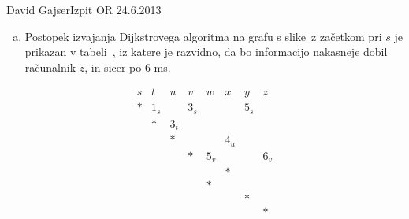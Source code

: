 \begin{naloga}{David Gajser}{Izpit OR 24.6.2013}
\begin{odgovor}
\begin{enumerate}[(a)]
\item Postopek izvajanja Dijkstrovega algoritma
na grafu s slike~ z začetkom pri $s$
je prikazan v tabeli~\tab,
iz katere je razvidno, da bo informacijo nakasneje dobil računalnik $z$,
in sicer po $6$ ms.
\end{enumerate}
%
\begin{slika}
\end{slika}
%
\begin{tabela}[h]
$$
\begin{array}{cccccccc}
s & t & u & v & w & x & y & z \\ \hline
* & 1_s && 3_s &&& 5_s & \\
& * & 3_t &&&&& \\
&& * &&& 4_u && \\
&&& * & 5_v &&& 6_v \\
&&&&& * && \\
&&&& * &&& \\
&&&&&& * & \\
&&&&&&& *
\end{array}
$$
\end{tabela}
\end{odgovor}
\end{naloga}
